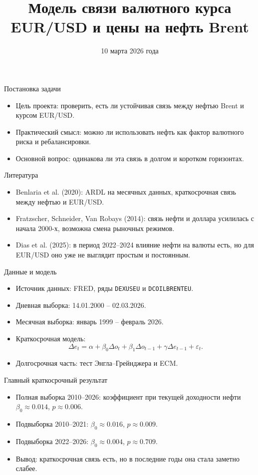 \documentclass[aspectratio=169]{beamer}
\title{Модель связи валютного курса EUR/USD и цены на нефть Brent}
\author{}
\date{10 марта 2026 года}
\begin{document}
\begin{frame}
\titlepage
\end{frame}

\begin{frame}{Постановка задачи}
\begin{itemize}
    \item Цель проекта: проверить, есть ли устойчивая связь между нефтью Brent и курсом EUR/USD.
    \item Практический смысл: можно ли использовать нефть как фактор валютного риска и ребалансировки.
    \item Основной вопрос: одинакова ли эта связь в долгом и коротком горизонтах.
\end{itemize}
\end{frame}

\begin{frame}{Литература}
\begin{itemize}
    \item Benlaria et al. (2020): ARDL на месячных данных, краткосрочная связь между нефтью и EUR/USD.
    \item Fratzscher, Schneider, Van Robays (2014): связь нефти и доллара усилилась с начала 2000-х, возможна смена рыночных режимов.
    \item Dias et al. (2025): в период 2022--2024 влияние нефти на валюты есть, но для EUR/USD оно уже не выглядит простым и постоянным.
\end{itemize}
\end{frame}

\begin{frame}{Данные и модель}
\begin{itemize}
    \item Источник данных: FRED, ряды \texttt{DEXUSEU} и \texttt{DCOILBRENTEU}.
    \item Дневная выборка: 14.01.2000 -- 02.03.2026.
    \item Месячная выборка: январь 1999 -- февраль 2026.
    \item Краткосрочная модель:
    \[
    \Delta e_t=\alpha+\beta_0\Delta o_t+\beta_1\Delta o_{t-1}+\gamma\Delta e_{t-1}+\varepsilon_t.
    \]
    \item Долгосрочная часть: тест Энгла--Грейнджера и ECM.
\end{itemize}
\end{frame}

\begin{frame}{Главный краткосрочный результат}
\begin{itemize}
    \item Полная выборка 2010--2026: коэффициент при текущей доходности нефти $\beta_0 \approx 0.014$, $p \approx 0.006$.
    \item Подвыборка 2010--2021: $\beta_0 \approx 0.016$, $p \approx 0.009$.
    \item Подвыборка 2022--2026: $\beta_0 \approx 0.004$, $p \approx 0.709$.
    \item Вывод: краткосрочная связь есть, но в последние годы она стала заметно слабее.
\end{itemize}
\end{frame}
\end{document}
